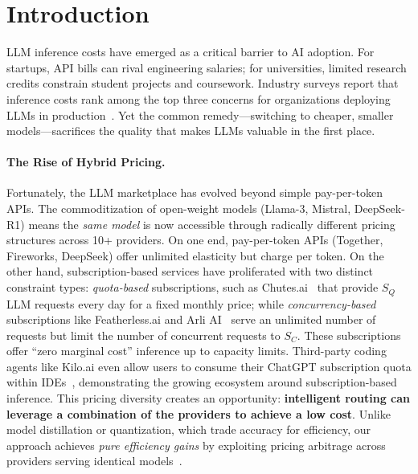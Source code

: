 \section{Introduction}
\label{sec:intro}

LLM inference costs have emerged as a critical barrier to AI adoption. For startups, API bills can rival engineering salaries; for universities, limited research credits constrain student projects and coursework. Industry surveys report that inference costs rank among the top three concerns for organizations deploying LLMs in production~\cite{mlops_llm_survey_2023}.
Yet the common remedy---switching to cheaper, smaller models---sacrifices the quality that makes LLMs valuable in the first place.

\paragraph{The Rise of Hybrid Pricing.}
Fortunately, the LLM marketplace has evolved beyond simple pay-per-token APIs. The commoditization of open-weight models (Llama-3, Mistral, DeepSeek-R1) means the \textit{same model} is now accessible through radically different pricing structures across 10+ providers.\cite{meta_llama3_2024,mistral7b_2023,deepseek_r1_github_2025,llama_e2e_cloud_guide} On one end, pay-per-token APIs (Together, Fireworks, DeepSeek) offer unlimited elasticity but charge per token. On the other hand, subscription-based services have proliferated with two distinct constraint types: \textit{quota-based} subscriptions, such as  Chutes.ai~\cite{chutes_pricing} that provide $S_Q$ LLM requests every day for a fixed monthly price; while \textit{concurrency-based} subscriptions like Featherless.ai and Arli AI~\cite{featherless-plans,arli-pricing} serve an unlimited number of requests but limit the number of concurrent requests to $S_C$. These subscriptions offer ``zero marginal cost'' inference up to capacity limits.
Third-party coding agents like Kilo.ai even allow users to consume their ChatGPT subscription quota within IDEs~\cite{kilo_chatgpt_blog}, demonstrating the growing ecosystem around subscription-based inference.
This pricing diversity creates an opportunity: \textbf{intelligent routing can leverage a combination of the providers to achieve a low cost}.
Unlike model distillation or quantization, which trade accuracy for efficiency, our approach achieves \textit{pure efficiency gains} by exploiting pricing arbitrage across providers serving identical models~\cite{hinton_distillation_2015,frantar_gptq_2022,dettmers_llmint8_2022}.

